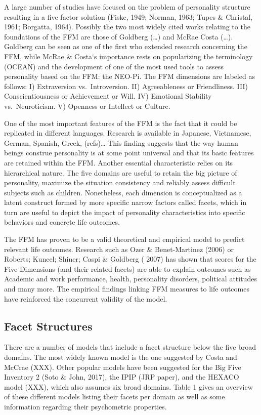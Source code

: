 \documentclass[man]{apa6}
\theoremstyle{definition}
\theoremstyle{definition}
\theoremstyle{definition}
\theoremstyle{remark}
\begin{document}
A large number of studies have focused on the problem of personality
structure resulting in a five factor solution (Fiske, 1949; Norman,
1963; Tupes \& Christal, 1961; Borgatta, 1964). Possibly the two most
widely cited works relating to the foundations of the FFM are those of
Goldberg (\ldots{}) and McRae Costa (\ldots{}). Goldberg can be seen as
one of the first who extended research concerning the FFM, while McRae
\& Costa`s importance rests on popularizing the terminology (OCEAN) and
the development of one of the most used tools to assess personality
based on the FFM: the NEO-Pi. The FFM dimensions are labeled as follows:
I) Extraversion vs.~Introversion. II) Agreeableness or Friendliness.
III) Conscientiousness or Achievement or Will. IV) Emotional Stability
vs.~Neuroticism. V) Openness or Intellect or Culture.

One of the most important features of the FFM is the fact that it could
be replicated in different languages. Research is available in Japanese,
Vietnamese, German, Spanish, Greek, (refs)\ldots{} This finding suggests
that the way human beings construe personality is at some point
universal and that its basic features are retained within the FFM.
Another essential characteristic relies on its hierarchical nature. The
five domains are useful to retain the big picture of personality,
maximize the situation consistency and reliably assess difficult
subjects such as children. Nonetheless, each dimension is conceptualized
as a latent construct formed by more specific narrow factors called
facets, which in turn are useful to depict the impact of personality
characteristics into specific behaviors and concrete life outcomes.

The FFM has proven to be a valid theoretical and empirical model to
predict relevant life outcomes. Research such as Ozer \& Benet-Martinez
(2006) or Roberts; Kuncel; Shiner; Caspi \& Goldberg ( 2007) has shown
that scores for the Five Dimensions (and their related facets) are able
to explain outcomes such as Academic and work performance, health,
personality disorders, political attitudes and many more. The empirical
findings linking FFM measures to life outcomes have reinforced the
concurrent validity of the model.

\hypertarget{facet-structures}{%
\subsection{Facet Structures}\label{facet-structures}}

There are a number of models that include a facet structure below the
five broad domains. The most widely known model is the one suggested by
Costa and McCrae (XXX). Other popular models have been suggested for the
Big Five Inventory 2 (Soto \& John, 2017), the IPIP (JRP paper), and the
HEXACO model (XXX), which also assumes six broad domains. Table 1 gives
an overview of these different models listing their facets per domain as
well as some information regarding their psychometric properties.
\end{document}
